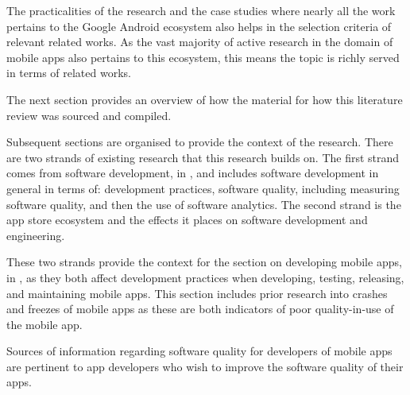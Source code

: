 The practicalities of the research and the case studies where nearly all the work pertains to the Google Android ecosystem also helps in the selection criteria of relevant related works. As the vast majority of active research in the domain of mobile apps also pertains to this ecosystem, this means the topic is richly served in terms of related works.

The next section provides an overview of how the material for how this literature review was sourced and compiled.

Subsequent sections are organised to provide the context of the research. There are two strands of existing research that this research builds on. The first strand comes from software development, in , and includes software development in general in terms of: development practices, software quality, including measuring software quality, and then the use of software analytics. The second strand is the app store ecosystem and the effects it places on software development and engineering.

These two strands provide the context for the section on developing mobile apps, in , as they both affect development practices when developing, testing, releasing, and maintaining mobile apps. This section includes prior research into crashes and freezes of mobile apps as these are both indicators of poor quality-in-use of the mobile app.

Sources of information regarding software quality for developers of mobile apps are pertinent to app developers who wish to improve the software quality of their apps.


